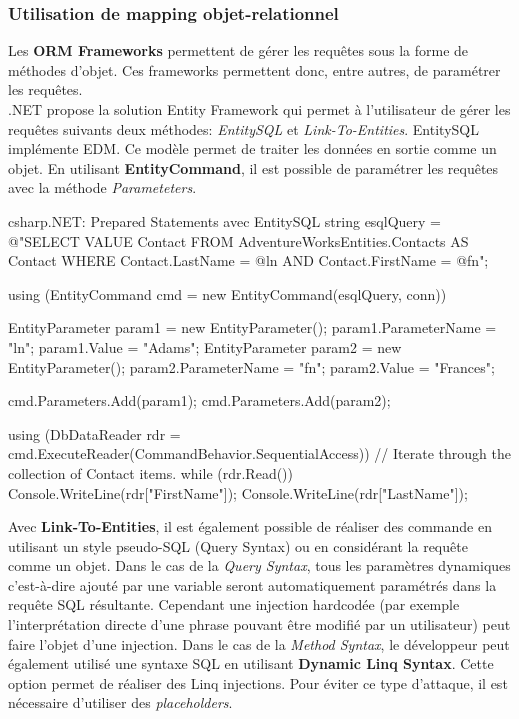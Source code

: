 \subsubsection{Utilisation de mapping objet-relationnel}
Les \textbf{\gls{ORM} Frameworks} permettent de gérer les requêtes sous la forme de méthodes d'objet. Ces frameworks permettent donc, entre autres, de paramétrer les requêtes.\\
.NET propose la solution Entity Framework qui permet à l'utilisateur de gérer les requêtes suivants deux méthodes: \textit{EntitySQL} et \textit{Link-To-Entities}.
EntitySQL implémente \gls{EDM}. Ce modèle permet de traiter les données en sortie comme un objet. En utilisant \textbf{EntityCommand}, il est possible de paramétrer les requêtes avec la méthode \textit{Parameteters}.
\begin{Config}{csharp}{.NET: Prepared Statements avec EntitySQL}
    string esqlQuery =
        @"SELECT VALUE Contact FROM AdventureWorksEntities.Contacts 
                    AS Contact WHERE Contact.LastName = @ln AND
                    Contact.FirstName = @fn";

    using (EntityCommand cmd = new EntityCommand(esqlQuery, conn))
    {
        EntityParameter param1 = new EntityParameter();
        param1.ParameterName = "ln";
        param1.Value = "Adams";
        EntityParameter param2 = new EntityParameter();
        param2.ParameterName = "fn";
        param2.Value = "Frances";

        cmd.Parameters.Add(param1);
        cmd.Parameters.Add(param2);

        using (DbDataReader rdr = cmd.ExecuteReader(CommandBehavior.SequentialAccess))
        {
            // Iterate through the collection of Contact items.
            while (rdr.Read())
            {
                Console.WriteLine(rdr["FirstName"]);
                Console.WriteLine(rdr["LastName"]);
            }
        }
    }
\end{Config}

Avec \textbf{Link-To-Entities}, il est également possible de réaliser des commande en utilisant un style pseudo-SQL (Query Syntax) ou en considérant la requête comme un objet. Dans le cas de la \textit{Query Syntax}, tous les paramètres dynamiques c'est-à-dire ajouté par une variable seront automatiquement paramétrés dans la requête SQL résultante. Cependant une injection hardcodée (par exemple l'interprétation directe d'une phrase pouvant être modifié par un utilisateur) peut faire l'objet d'une injection. Dans le cas de la \textit{Method Syntax}, le développeur peut également utilisé une syntaxe SQL en utilisant \textbf{Dynamic Linq Syntax}. Cette option permet de réaliser des Linq injections. Pour éviter ce type d'attaque, il est nécessaire d'utiliser des \textit{placeholders}.

